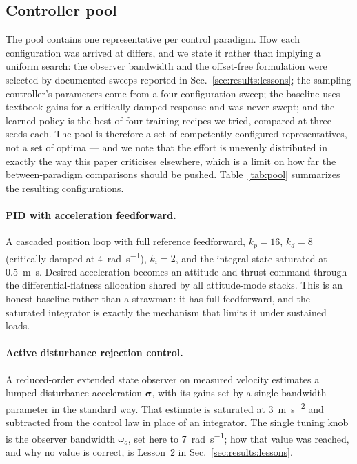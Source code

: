 \subsection{Controller pool}
\label{sec:method:pool}

The pool contains one representative per control paradigm. How each configuration was
arrived at differs, and we state it rather than implying a uniform search: the observer
bandwidth and the offset-free formulation were selected by documented sweeps reported in
Sec.~\ref{sec:results:lessons}; the sampling controller's parameters come from a
four-configuration sweep; the baseline uses textbook gains for a critically damped
response and was never swept; and the learned policy is the best of four training
recipes we tried, compared at three seeds each. The pool is therefore a set of
competently configured representatives, not a set of optima --- and we note that the
effort is unevenly distributed in exactly the way this paper criticises elsewhere,
which is a limit on how far the between-paradigm comparisons should be pushed.
Table~\ref{tab:pool} summarizes the resulting configurations.

\paragraph{PID with acceleration feedforward.}
A cascaded position loop with full reference feedforward, $k_p = 16$, $k_d = 8$
(critically damped at \SI{4}{\radian\per\second}), $k_i = 2$, and the integral state
saturated at \SI{0.5}{\meter\second}. Desired acceleration becomes an attitude and
thrust command through the differential-flatness allocation shared by all attitude-mode
stacks\cite{mellinger2011minimum}. This is an honest baseline rather than a strawman: it
has full feedforward, and the saturated integrator is exactly the mechanism that limits
it under sustained loads.

\paragraph{Active disturbance rejection control.}
A reduced-order extended state observer on measured velocity estimates a lumped
disturbance acceleration $\boldsymbol{\sigma}$, with its gains set by a single
bandwidth parameter in the standard way\cite{gao2003scaling,han2009adrc}. That estimate is saturated at
\SI{3}{\meter\per\second\squared} and subtracted from the control law in place of an
integrator. The single tuning knob is the observer bandwidth $\omega_o$, set here to
\SI{7}{\radian\per\second}; how that value was reached, and why no value is correct, is
Lesson~2 in Sec.~\ref{sec:results:lessons}.

